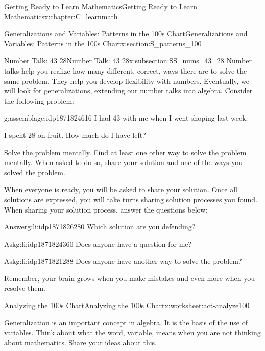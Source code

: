 \documentclass[oneside,10pt,]{book}
\numberwithin{equation}{chapter}
\begin{document}
\begin{chapterptx}{Getting Ready to Learn Mathematics}{}{Getting Ready to Learn Mathematics}{}{}{x:chapter:C_learnmath}
\begin{sectionptx}{Generalizations and Variables: Patterns in the 100s Chart}{}{Generalizations and Variables: Patterns in the 100s Chart}{}{}{x:section:S_patterns_100}
\begin{subsectionptx}{Number Talk: 43 \textminus{} 28}{}{Number Talk: 43 \textminus{} 28}{}{}{x:subsection:SS_nums_43_28}
Number talks help you realize how many different, correct, ways there are to solve the same problem. They help you develop flexibility with numbers. Eventually, we will look for generalizations, extending our number talks into algebra. Consider the following problem:%
\begin{assemblage}{}{g:assemblage:idp1871824616}%
I had \textdollar{}43 with me when I went shoping last week.%
\par
I spent \textdollar{}28 on fruit. How much do I have left?%
\par
Solve the problem mentally. Find at least one other way to solve the problem mentally. When asked to do so, share your solution and one of the ways you solved the problem.%
\end{assemblage}
When everyone is ready, you will be asked to share your solution. Once all solutions are expressed, you will take turns sharing solution processes you found. When sharing your solution process, answer the questions below:%
\begin{descriptionlist}
\begin{dlimedium}{Answer}{g:li:idp1871826280}%
Which solution are you defending?%
\end{dlimedium}%
\begin{dlimedium}{Ask}{g:li:idp1871824360}%
Does anyone have a question for me?%
\end{dlimedium}%
\begin{dlimedium}{Ask}{g:li:idp1871821288}%
Does anyone have another way to solve the problem?%
\end{dlimedium}%
\end{descriptionlist}
Remember, your brain grows when you make mistakes and even more when you resolve them.%
\end{subsectionptx}
%
%
\typeout{************************************************}
\typeout{************************************************}
%
\begin{worksheet-subsection}{Analyzing the 100s Chart}{}{Analyzing the 100s Chart}{}{}{x:worksheet:act-analyze100}
\begin{introduction}{}%
Generalization is an important concept in algebra. It is the basis of the use of variables. Think about what the word, variable, means when you are not thinking about mathematics. Share your ideas about this.%
\par

\end{introduction}
\end{worksheet-subsection}
\end{sectionptx}
\end{chapterptx}
\end{document}
